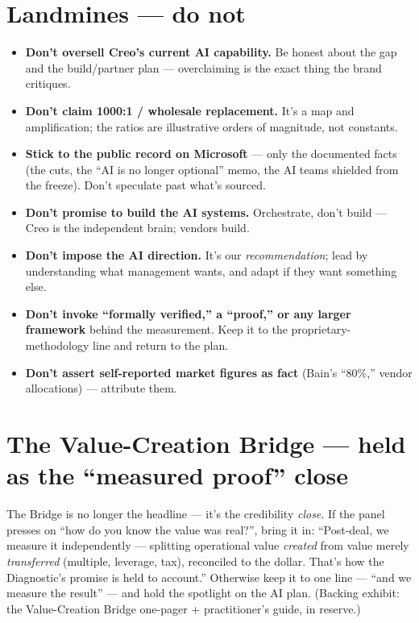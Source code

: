 \documentclass[11pt]{article}
\begin{document}
\section{Landmines --- do not}
\begin{landmine}
\begin{itemize}
  \item \textbf{Don't oversell Creo's current AI capability.} Be honest about the gap and the
  build/partner plan --- overclaiming is the exact thing the brand critiques.
  \item \textbf{Don't claim 1000:1 / wholesale replacement.} It's a map and amplification; the
  ratios are illustrative orders of magnitude, not constants.
  \item \textbf{Stick to the public record on Microsoft} --- only the documented facts (the cuts,
  the ``AI is no longer optional'' memo, the AI teams shielded from the freeze). Don't speculate
  past what's sourced.
  \item \textbf{Don't promise to build the AI systems.} Orchestrate, don't build --- Creo is the
  independent brain; vendors build.
  \item \textbf{Don't impose the AI direction.} It's our \emph{recommendation}; lead by
  understanding what management wants, and adapt if they want something else.
  \item \textbf{Don't invoke ``formally verified,'' a ``proof,'' or any larger framework} behind
  the measurement. Keep it to the proprietary-methodology line and return to the plan.
  \item \textbf{Don't assert self-reported market figures as fact} (Bain's ``80\%,'' vendor
  allocations) --- attribute them.
\end{itemize}
\end{landmine}

\section{The Value-Creation Bridge --- held as the ``measured proof'' close}
The Bridge is no longer the headline --- it's the credibility \emph{close}. If the panel presses
on ``how do you know the value was real?'', bring it in: ``Post-deal, we measure it independently
--- splitting operational value \emph{created} from value merely \emph{transferred} (multiple,
leverage, tax), reconciled to the dollar. That's how the Diagnostic's promise is held to
account.'' Otherwise keep it to one line --- ``and we measure the result'' --- and hold the
spotlight on the AI plan. (Backing exhibit: the Value-Creation Bridge one-pager + practitioner's
guide, in reserve.)
\end{document}
